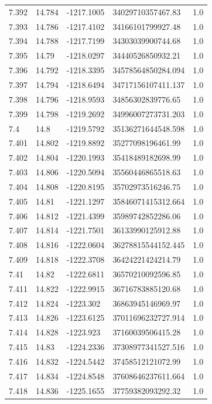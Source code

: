 \begin{tabular}{lllll}
7.392 & 14.784 & -1217.1005 & 34029710357467.83 & 1.0 \\
7.393 & 14.786 & -1217.4102 & 34166101799927.48 & 1.0 \\
7.394 & 14.788 & -1217.7199 & 34303039900744.68 & 1.0 \\
7.395 & 14.79 & -1218.0297 & 34440526850932.21 & 1.0 \\
7.396 & 14.792 & -1218.3395 & 34578564850284.094 & 1.0 \\
7.397 & 14.794 & -1218.6494 & 34717156107411.137 & 1.0 \\
7.398 & 14.796 & -1218.9593 & 34856302839776.65 & 1.0 \\
7.399 & 14.798 & -1219.2692 & 34996007273731.203 & 1.0 \\
7.4 & 14.8 & -1219.5792 & 35136271644548.598 & 1.0 \\
7.401 & 14.802 & -1219.8892 & 35277098196461.99 & 1.0 \\
7.402 & 14.804 & -1220.1993 & 35418489182698.99 & 1.0 \\
7.403 & 14.806 & -1220.5094 & 35560446865518.63 & 1.0 \\
7.404 & 14.808 & -1220.8195 & 35702973516246.75 & 1.0 \\
7.405 & 14.81 & -1221.1297 & 35846071415312.664 & 1.0 \\
7.406 & 14.812 & -1221.4399 & 35989742852286.06 & 1.0 \\
7.407 & 14.814 & -1221.7501 & 36133990125912.88 & 1.0 \\
7.408 & 14.816 & -1222.0604 & 36278815544152.445 & 1.0 \\
7.409 & 14.818 & -1222.3708 & 36424221424214.79 & 1.0 \\
7.41 & 14.82 & -1222.6811 & 36570210092596.85 & 1.0 \\
7.411 & 14.822 & -1222.9915 & 36716783885120.68 & 1.0 \\
7.412 & 14.824 & -1223.302 & 36863945146969.97 & 1.0 \\
7.413 & 14.826 & -1223.6125 & 37011696232727.914 & 1.0 \\
7.414 & 14.828 & -1223.923 & 37160039506415.28 & 1.0 \\
7.415 & 14.83 & -1224.2336 & 37308977341527.516 & 1.0 \\
7.416 & 14.832 & -1224.5442 & 37458512121072.99 & 1.0 \\
7.417 & 14.834 & -1224.8548 & 37608646237611.664 & 1.0 \\
7.418 & 14.836 & -1225.1655 & 37759382093292.32 & 1.0 \\

\end{tabular}

